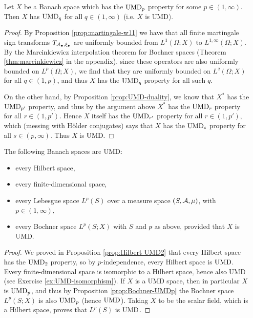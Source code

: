\begin{thm}\label{thm:UMD-p-independent}
  Let $X$ be a Banach space which has the $\mathrm{UMD}_{p}$ property for some $p \in (1,\infty)$.
  Then $X$ has $\mathrm{UMD}_{q}$ for all $q \in (1,\infty)$ (i.e. $X$ is UMD).
\end{thm}

\begin{proof}
  By Proposition \ref{prop:martingale-w11} we have that all finite martingale sign transforms $T_{\mathcal{A}_{\bullet}, \xi_{\bullet}}$ are uniformly bounded from $L^1(\Omega;X)$ to $L^{1,\infty}(\Omega;X)$.
  By the Marcinkiewicz interpolation theorem for Bochner spaces (Theorem \ref{thm:marcinkiewicz} in the appendix), since these operators are also uniformly bounded on $L^p(\Omega;X)$, we find that they are uniformly bounded on $L^q(\Omega;X)$ for all $q \in (1,p)$, and thus $X$ has the $\mathrm{UMD}_{q}$ property for all such $q$.

  On the other hand, by Proposition \ref{prop:UMD-duality}, we know that $X^{*}$ has the $\mathrm{UMD}_{p'}$ property, and thus by the argument above $X^{*}$ has the $\mathrm{UMD}_{r}$ property for all $r \in (1,p')$.
  Hence $X$ itself has the $\mathrm{UMD}_{r'}$ property for all $r \in (1,p')$, which (messing with H\"older conjugates) says that $X$ has the $\mathrm{UMD}_{s}$ property for all $s \in (p,\infty)$.
  Thus $X$ is UMD.
\end{proof}

\begin{cor}
  The following Banach spaces are UMD:
  \begin{itemize}
  \item every Hilbert space,
  \item every finite-dimensional space,
  \item every Lebesgue space $L^p(S)$ over a measure space $(S,\mathcal{A},\mu)$, with $p \in (1,\infty)$,
  \item every Bochner space $L^p(S;X)$ with $S$ and $p$ as above, provided that $X$ is UMD.
  \end{itemize}
\end{cor}

\begin{proof}
  We proved in Proposition \ref{prop:Hilbert-UMD2} that every Hilbert space has the $\mathrm{UMD}_{2}$ property, so by $p$-independence, every Hilbert space is $\mathrm{UMD}$.
  Every finite-dimensional space is isomorphic to a Hilbert space, hence also UMD (see Exercise \ref{ex:UMD-isomorphism}).
  If $X$ is a UMD space, then in particular $X$ is $\mathrm{UMD}_{p}$, and thus by Proposition \ref{prop:Bochner-UMDp} the Bochner space $L^p(S;X)$ is also $\mathrm{UMD}_{p}$ (hence $\mathrm{UMD}$).
  Taking $X$ to be the scalar field, which is a Hilbert space, proves that $L^p(S)$ is $\mathrm{UMD}$.
\end{proof}

